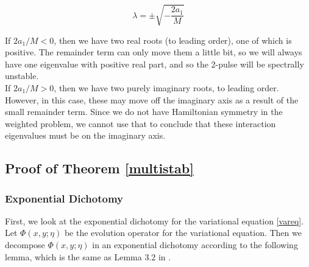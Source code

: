 \documentclass[12pt]{article}
\begin{document}
\[
\lambda = \pm \sqrt{ -\frac{ 2 a_1 }{M} }
\] 

If $2 a_1/M < 0$, then we have two real roots (to leading order), one of which is positive. The remainder term can only move them a little bit, so we will always have one eigenvalue with positive real part, and so the 2-pulse will be spectrally unstable.\\

If $2 a_1/M > 0$, then we have two purely imaginary roots, to leading order. However, in this case, these may move off the imaginary axis as a result of the small remainder term. Since we do not have Hamiltonian symmetry in the weighted problem, we cannot use that to conclude that these interaction eigenvalues must be on the imaginary axis.

\subsection{Proof of Theorem \ref{multistab}}

\subsubsection{Exponential Dichotomy}

First, we look at the exponential dichotomy for the variational equation \eqref{vareq}. Let $\Phi(x, y; \eta)$ be the evolution operator for the variational equation. Then we decompose $\Phi(x, y; \eta)$ in an exponential dichotomy according to the following lemma, which is the same as Lemma 3.2 in \cite{Sandstede1998}.

\end{document}
